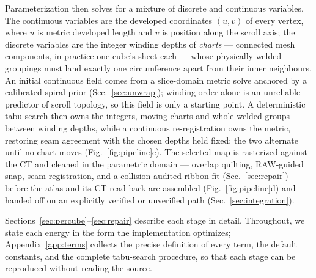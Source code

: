 Parameterization then solves for a mixture of discrete and continuous variables. The continuous variables are the developed coordinates $(u,v)$ of every vertex, where $u$ is metric developed length and $v$ is position along the scroll axis; the discrete variables are the integer winding depths of {\em charts} --- connected mesh components, in practice one cube's sheet each --- whose physically welded groupings must land exactly one circumference apart from their inner neighbours. An initial continuous field comes from a slice-domain metric solve anchored by a calibrated spiral prior (Sec.~\ref{sec:unwrap}); winding order alone is an unreliable predictor of scroll topology, so this field is only a starting point. A deterministic tabu search then owns the integers, moving charts and whole welded groups between winding depths, while a continuous re-registration owns the metric, restoring seam agreement with the chosen depths held fixed; the two alternate until no chart moves (Fig.~\ref{fig:pipeline}c). The selected map is rasterized against the CT and cleaned in the parametric domain --- overlap quilting, RAW-guided snap, seam registration, and a collision-audited ribbon fit (Sec.~\ref{sec:repair}) --- before the atlas and its CT read-back are assembled (Fig.~\ref{fig:pipeline}d) and handed off on an explicitly verified or unverified path (Sec.~\ref{sec:integration}).

Sections~\ref{sec:percube}--\ref{sec:repair} describe each stage in detail. Throughout, we state each energy in the form the implementation optimizes; Appendix~\ref{app:terms} collects the precise definition of every term, the default constants, and the complete tabu-search procedure, so that each stage can be reproduced without reading the source.
